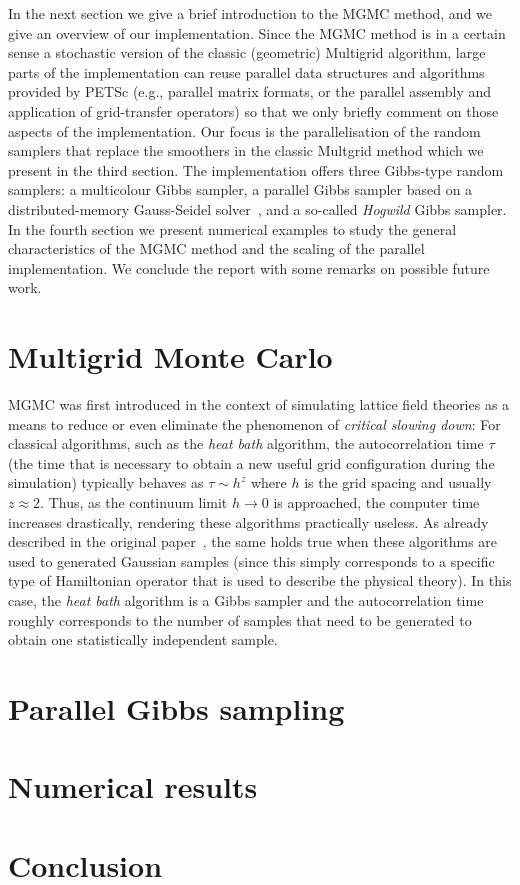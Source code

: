\documentclass[
fontsize=11pt,
paper=a4,
numbers=noenddot,
parskip=half
]{scrartcl}
\begin{document}
In the next section we give a brief introduction to the MGMC method, and we give an overview of our implementation. Since the MGMC method is in a certain sense a stochastic version of the classic (geometric) Multigrid algorithm, large parts of the implementation can reuse parallel data structures and algorithms provided by PETSc (e.g., parallel matrix formats, or the parallel assembly and application of grid-transfer operators) so that we only briefly comment on those aspects of the implementation. Our focus is the parallelisation of the random samplers that replace the smoothers in the classic Multgrid method which we present in the third section. The implementation offers three Gibbs-type random samplers: a multicolour Gibbs sampler, a parallel Gibbs sampler based on a distributed-memory Gauss-Seidel solver~\cite{adams2001}, and a so-called \emph{Hogwild} Gibbs sampler. In the fourth section we present numerical examples to study the general characteristics of the MGMC method and the scaling of the parallel implementation. We conclude the report with some remarks on possible future work.

\section{Multigrid Monte Carlo}
MGMC was first introduced in the context of simulating lattice field theories as a means to reduce or even eliminate the phenomenon of \emph{critical slowing down}: For classical algorithms, such as the \emph{heat bath} algorithm, the autocorrelation time $\tau$ (the time that is necessary to obtain a new useful grid configuration during the simulation) typically behaves as $\tau \sim h^z$ where $h$ is the grid spacing and usually $z \approx 2$. Thus, as the continuum limit $h \rightarrow 0$ is approached, the computer time increases drastically, rendering these algorithms practically useless. As already described in the original paper~\cite{goodmansokal}, the same holds true when these algorithms are used to generated Gaussian samples (since this simply corresponds to a specific type of Hamiltonian operator that is used to describe the physical theory). In this case, the \emph{heat bath} algorithm is a Gibbs sampler and the autocorrelation time roughly corresponds to the number of samples that need to be generated to obtain one statistically independent sample.

\section{Parallel Gibbs sampling}

\section{Numerical results}

\section{Conclusion}


\printbibliography
\end{document}
